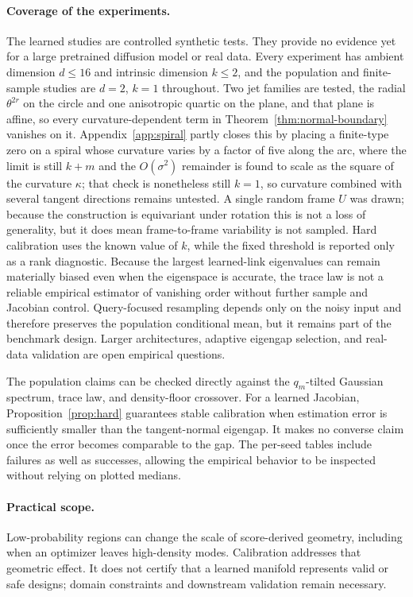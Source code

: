 \documentclass[10pt]{article}
\theoremstyle{c2fup}
\begin{document}
\paragraph{Coverage of the experiments.}
The learned studies are controlled synthetic tests.  They provide no evidence yet for a large pretrained diffusion model or real data.  Every experiment has ambient dimension $d\le16$ and intrinsic dimension $k\le2$, and the population and finite-sample studies are $d=2$, $k=1$ throughout.  Two jet families are tested, the radial $\theta^{2r}$ on the circle and one anisotropic quartic on the plane, and that plane is affine, so every curvature-dependent term in Theorem~\ref{thm:normal-boundary} vanishes on it.  Appendix~\ref{app:spiral} partly closes this by placing a finite-type zero on a spiral whose curvature varies by a factor of five along the arc, where the limit is still $k+m$ and the $O(\sigma^2)$ remainder is found to scale as the square of the curvature $\kappa$; that check is nonetheless still $k=1$, so curvature combined with several tangent directions remains untested.  A single random frame $U$ was drawn; because the construction is equivariant under rotation this is not a loss of generality, but it does mean frame-to-frame variability is not sampled.  Hard calibration uses the known value of $k$, while the fixed threshold is reported only as a rank diagnostic.  Because the largest learned-link eigenvalues can remain materially biased even when the eigenspace is accurate, the trace law is not a reliable empirical estimator of vanishing order without further sample and Jacobian control.  Query-focused resampling depends only on the noisy input and therefore preserves the population conditional mean, but it remains part of the benchmark design.  Larger architectures, adaptive eigengap selection, and real-data validation are open empirical questions.

The population claims can be checked directly against the $q_m$-tilted Gaussian spectrum, trace law, and density-floor crossover.  For a learned Jacobian, Proposition~\ref{prop:hard} guarantees stable calibration when estimation error is sufficiently smaller than the tangent-normal eigengap.  It makes no converse claim once the error becomes comparable to the gap.  The per-seed tables include failures as well as successes, allowing the empirical behavior to be inspected without relying on plotted medians.

\paragraph{Practical scope.}
Low-probability regions can change the scale of score-derived geometry, including when an optimizer leaves high-density modes.  Calibration addresses that geometric effect.  It does not certify that a learned manifold represents valid or safe designs; domain constraints and downstream validation remain necessary.
\end{document}
